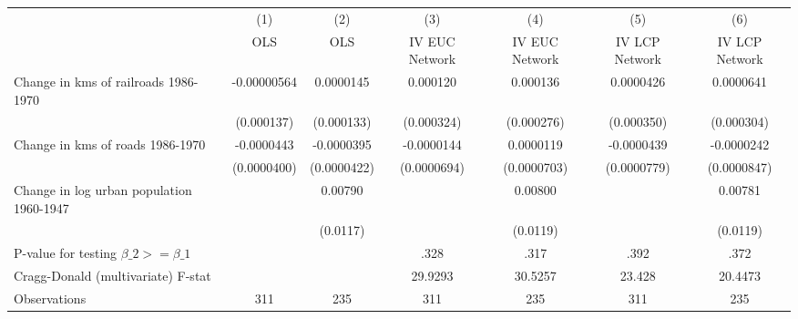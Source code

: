 {
\def\sym#1{\ifmmode^{#1}\else\(^{#1}\)\fi}
\begin{tabular}{l*{6}{c}}
\hline\hline
                &\multicolumn{1}{c}{(1)}&\multicolumn{1}{c}{(2)}&\multicolumn{1}{c}{(3)}&\multicolumn{1}{c}{(4)}&\multicolumn{1}{c}{(5)}&\multicolumn{1}{c}{(6)}\\
                &\multicolumn{1}{c}{OLS}&\multicolumn{1}{c}{OLS}&\multicolumn{1}{c}{IV EUC Network}&\multicolumn{1}{c}{IV EUC Network}&\multicolumn{1}{c}{IV LCP Network}&\multicolumn{1}{c}{IV LCP Network}\\
\hline
Change in kms of railroads 1986-1970&-0.00000564         &0.0000145         & 0.000120         & 0.000136         &0.0000426         &0.0000641         \\
                &(0.000137)         &(0.000133)         &(0.000324)         &(0.000276)         &(0.000350)         &(0.000304)         \\
[1em]
Change in kms of roads 1986-1970&-0.0000443         &-0.0000395         &-0.0000144         &0.0000119         &-0.0000439         &-0.0000242         \\
                &(0.0000400)         &(0.0000422)         &(0.0000694)         &(0.0000703)         &(0.0000779)         &(0.0000847)         \\
[1em]
Change in log urban population 1960-1947&                  &  0.00790         &                  &  0.00800         &                  &  0.00781         \\
                &                  & (0.0117)         &                  & (0.0119)         &                  & (0.0119)         \\
\hline
P-value for testing $\beta\_{2} >= \beta\_{1}$&                  &                  &     .328         &     .317         &     .392         &     .372         \\
Cragg-Donald (multivariate) F-stat&                  &                  &  29.9293         &  30.5257         &   23.428         &  20.4473         \\
Observations    &      311         &      235         &      311         &      235         &      311         &      235         \\
\hline\hline
\end{tabular}
}
